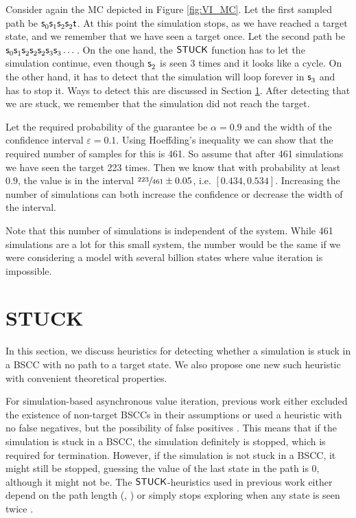 \begin{example}\label{ex:smc}
	Consider again the MC depicted in Figure \ref{fig:VI_MC}.
    Let the first sampled path be $\state<0> \state<1> \state<2> \state<2> \mathsf t$. At this point the simulation stops, as we have reached a target state, and we remember that we have seen a target once.
    Let the second path be $\state<0> \state<1> \state<2> \state<2> \state<2> \state<3> \state<3> \dots$.
    On the one hand, the $\mathsf{STUCK}$ function has to let the simulation continue, even though $\state<2>$ is seen 3 times and it looks like a cycle.  
    On the other hand, it has to detect that the simulation will loop forever in $\state<3>$ and has to stop it.
    Ways to detect this are discussed in Section \ref{sec:stuck}.
    After detecting that we are stuck, we remember that the simulation did not reach the target.
        
    Let the required probability of the guarantee be $\alpha=0.9$ and the width of the confidence interval $\varepsilon=0.1$.
    Using Hoeffding's inequality \cite{hoeffding} we can show that the required number of samples for this is 461.
    So assume that after 461 simulations we have seen the target 223 times. 
    Then we know that with probability at least $0.9$, the value is in the interval $\sfrac {223} {461} \pm 0.05$, i.e. $[0.434,0.534]$.
    Increasing the number of simulations can both increase the confidence or decrease the width of the interval.
    
    Note that this number of simulations is independent of the system. While 461 simulations are a lot for this small system, the number would be the same if we were considering a model with several billion states where value iteration is impossible.
\end{example}



\section{STUCK}\label{sec:stuck}
In this section, we discuss heuristics for detecting whether a simulation is stuck in a BSCC with no path to a target state.
We also propose one new such heuristic with convenient theoretical properties.

For simulation-based asynchronous value iteration, previous work either excluded the existence of non-target BSCCs in their assumptions \cite{RTDP,BRTDP} or used a heuristic with no false negatives, but the possibility of false positives \cite{atva14}.
This means that if the simulation is stuck in a BSCC, the simulation definitely is stopped, which is required for termination. 
However, if the simulation is not stuck in a BSCC, it might still be stopped, guessing the value of the last state in the path is 0, although it might not be.
The $\mathsf{STUCK}$-heuristics used in previous work either depend on the path length (\cite{atva14}, \cite[Chapter 7.5]{ujma}) or simply stops exploring when any state is seen twice \cite[Appendix A.3]{cav19}.

